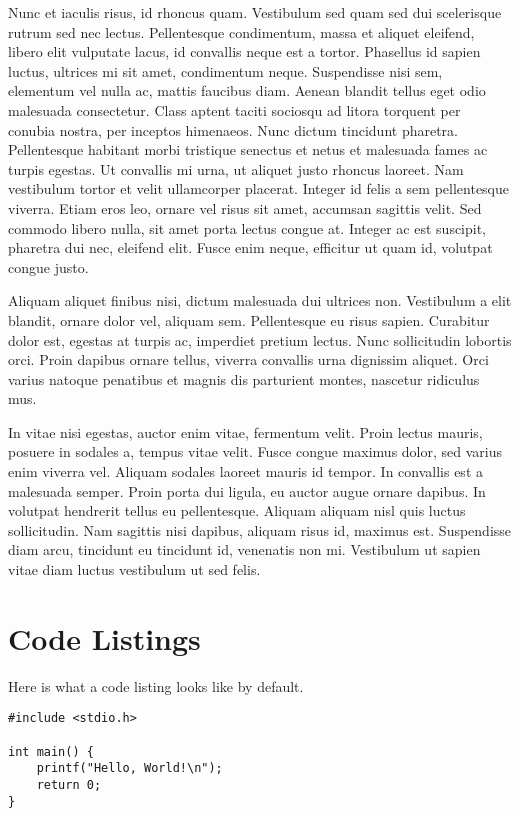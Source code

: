 Nunc et iaculis risus, id rhoncus quam. Vestibulum sed quam sed dui scelerisque rutrum sed nec lectus. Pellentesque condimentum, massa et aliquet eleifend, libero elit vulputate lacus, id convallis neque est a tortor. Phasellus id sapien luctus, ultrices mi sit amet, condimentum neque. Suspendisse nisi sem, elementum vel nulla ac, mattis faucibus diam. Aenean blandit tellus eget odio malesuada consectetur. Class aptent taciti sociosqu ad litora torquent per conubia nostra, per inceptos himenaeos. Nunc dictum tincidunt pharetra. Pellentesque habitant morbi tristique senectus et netus et malesuada fames ac turpis egestas. Ut convallis mi urna, ut aliquet justo rhoncus laoreet. Nam vestibulum tortor et velit ullamcorper placerat. Integer id felis a sem pellentesque viverra. Etiam eros leo, ornare vel risus sit amet, accumsan sagittis velit. Sed commodo libero nulla, sit amet porta lectus congue at. Integer ac est suscipit, pharetra dui nec, eleifend elit. Fusce enim neque, efficitur ut quam id, volutpat congue justo.

Aliquam aliquet finibus nisi, dictum malesuada dui ultrices non. Vestibulum a elit blandit, ornare dolor vel, aliquam sem. Pellentesque eu risus sapien. Curabitur dolor est, egestas at turpis ac, imperdiet pretium lectus. Nunc sollicitudin lobortis orci. Proin dapibus ornare tellus, viverra convallis urna dignissim aliquet. Orci varius natoque penatibus et magnis dis parturient montes, nascetur ridiculus mus.

In vitae nisi egestas, auctor enim vitae, fermentum velit. Proin lectus mauris, posuere in sodales a, tempus vitae velit. Fusce congue maximus dolor, sed varius enim viverra vel. Aliquam sodales laoreet mauris id tempor. In convallis est a malesuada semper. Proin porta dui ligula, eu auctor augue ornare dapibus. In volutpat hendrerit tellus eu pellentesque. Aliquam aliquam nisl quis luctus sollicitudin. Nam sagittis nisi dapibus, aliquam risus id, maximus est. Suspendisse diam arcu, tincidunt eu tincidunt id, venenatis non mi. Vestibulum ut sapien vitae diam luctus vestibulum ut sed felis.

\newpage

\section{Code Listings}

Here is what a code listing looks like by default.

\begin{lstlisting}
#include <stdio.h>

int main() {
    printf("Hello, World!\n");
    return 0;
}
\end{lstlisting}



